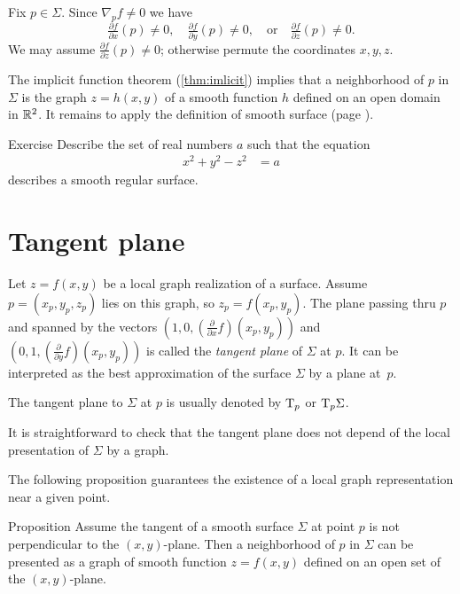 Fix $p\in\Sigma$.
Since $\nabla_p f\ne 0$ we have 
\[\tfrac{\partial f}{\partial x}(p)\ne 0,\quad \tfrac{\partial f}{\partial y}(p)\ne 0,\quad \text{or}\quad\tfrac{\partial f}{\partial z}(p)\ne 0.\]
We may assume $\tfrac{\partial f}{\partial z}(p)\ne 0$;
otherwise permute the coordinates $x,y,z$.

The implicit function theorem (\ref{thm:imlicit}) implies that a neighborhood of $p$ in $\Sigma$ is the graph $z=h(x,y)$ of a smooth function $h$ defined on an open domain in $\mathbb{R}^2$.
It remains to apply the definition of smooth surface (page \pageref{page:def-smooth-surface}).
\qeds

\begin{thm}{Exercise}\label{ex:hyperboloinds}
Describe the set of real numbers $a$
such that the equation
\begin{align*}
x^2+y^2-z^2&=a
\end{align*}
describes a smooth regular surface.
\end{thm}

\section*{Tangent plane}

Let $z=f(x,y)$ be a local graph realization of a surface. 
Assume $p=(x_p,y_p,z_p)$ lies on this graph, so $z_p=f(x_p,y_p)$.
The plane passing thru $p$ and spanned by the vectors $(1,0,(\tfrac{\partial}{\partial x}f)(x_p,y_p))$ and  $(0,1,(\tfrac{\partial}{\partial y}f)(x_p,y_p))$ is called the \emph{tangent plane} of $\Sigma$ at $p$.
It can be interpreted as the best approximation of the surface $\Sigma$ by a plane at~$p$.

The tangent plane to $\Sigma$ at $p$ is usually denoted by $\mathrm{T}_p$ or $\mathrm{T}_p\Sigma$.

It is straightforward to check that the tangent plane does not depend of the local presentation of $\Sigma$ by a graph.

The following proposition guarantees the existence of a local graph representation near a given point.

\begin{thm}{Proposition}\label{prop:perp}
Assume the tangent of a smooth surface $\Sigma$ at point $p$ is not perpendicular to the $(x,y)$-plane.
Then a neighborhood of $p$ in $\Sigma$ can be presented as a graph of smooth function $z=f(x,y)$ defined on an open set of the $(x,y)$-plane.
\end{thm}


